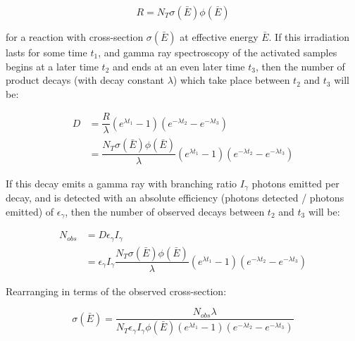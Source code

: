 \documentclass[5p]{elsarticle}
\newcommand{\pp}[1]{\left( #1\right)}
\begin{document}
\begin{equation}
R = N_T \sigma\pp{\bar{E}} \phi\pp{\bar{E}} 
\end{equation}

for a reaction with cross-section  $\sigma\pp{\bar{E}}$ at effective energy $\bar{E}$. If this irradiation lasts for  some time $t_1$, and gamma ray spectroscopy of the activated samples begins at a later time $t_2$ and ends at an even later time $t_3$, then the number of product decays (with decay constant $\lambda$) which take place between $t_2$ and $t_3$ will be:



\begin{equation}
\begin{aligned}
D &= \dfrac{R}{\lambda}\pp{e^{\lambda t_1}-1}\pp{e^{-\lambda t_2} - e^{-\lambda t_3}}
\\
&= \dfrac{N_T \sigma\pp{\bar{E}} \phi\pp{\bar{E}} }{\lambda}\pp{e^{\lambda t_1}-1}\pp{e^{-\lambda t_2} - e^{-\lambda t_3}} 
\end{aligned}
\end{equation}

If this decay emits a gamma ray with branching ratio $I_\gamma$ photons emitted per decay, and is detected with an absolute efficiency (photons detected / photons emitted) of $\epsilon_\gamma$, then the number of observed decays between $t_2$ and $t_3$ will be:


\begin{align}
N_{obs} &= D \epsilon_\gamma I_\gamma \\
&=  \epsilon_\gamma I_\gamma  \dfrac{N_T \sigma\pp{\bar{E}} \phi\pp{\bar{E}} }{\lambda}\pp{e^{\lambda t_1}-1}\pp{e^{-\lambda t_2} - e^{-\lambda t_3}} \nonumber
\end{align}

Rearranging in terms of the observed cross-section:

\begin{equation}
\sigma\pp{\bar{E}} = \dfrac{N_{obs}\lambda}{N_T \epsilon_\gamma I_\gamma  \phi\pp{\bar{E}}  \pp{e^{\lambda t_1}-1}\pp{e^{-\lambda t_2} - e^{-\lambda t_3}}}
\end{equation}
\end{document}
